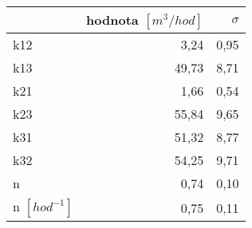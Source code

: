 \begin{tabular}{lrr}
\toprule
{} &  hodnota $\left[\si{m^3/hod}\right]$ &  $\sigma$ \\
\midrule
k12                 &                                 3,24 &      0,95 \\
k13                 &                                49,73 &      8,71 \\
k21                 &                                 1,66 &      0,54 \\
k23                 &                                55,84 &      9,65 \\
k31                 &                                51,32 &      8,77 \\
k32                 &                                54,25 &      9,71 \\
n                   &                                 0,74 &      0,10 \\
n $[\si{hod^{-1}}]$ &                                 0,75 &      0,11 \\
\bottomrule
\end{tabular}
